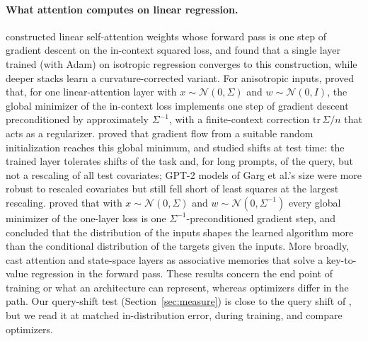 \paragraph{What attention computes on linear regression.} \citet{vonoswald2023} constructed linear self-attention weights whose forward pass is one step of gradient descent on the in-context squared loss, and found that a single layer trained (with Adam) on isotropic regression converges to this construction, while deeper stacks learn a curvature-corrected variant. For anisotropic inputs, \citet{ahn2023} proved that, for one linear-attention layer with $x \sim \mathcal N(0, \Sigma)$ and $w \sim \mathcal N(0, I)$, the global minimizer of the in-context loss implements one step of gradient descent preconditioned by approximately $\Sigma^{-1}$, with a finite-context correction $\mathrm{tr}\,\Sigma/n$ that acts as a regularizer. \citet{zhang2023trained} proved that gradient flow from a suitable random initialization reaches this global minimum, and studied shifts at test time: the trained layer tolerates shifts of the task and, for long prompts, of the query, but not a rescaling of all test covariates; GPT-2 models of Garg et al.'s size were more robust to rescaled covariates but still fell short of least squares at the largest rescaling. \citet{mahankali2023} proved that with $x \sim \mathcal N(0,\Sigma)$ and $w \sim \mathcal N(0, \Sigma^{-1})$ every global minimizer of the one-layer loss is one $\Sigma^{-1}$-preconditioned gradient step, and concluded that the distribution of the inputs shapes the learned algorithm more than the conditional distribution of the targets given the inputs. More broadly, \citet{wang2025testtime} cast attention and state-space layers as associative memories that solve a key-to-value regression in the forward pass. These results concern the end point of training or what an architecture can represent, whereas optimizers differ in the path. Our query-shift test (Section~\ref{sec:measure}) is close to the query shift of \citet{zhang2023trained}, but we read it at matched in-distribution error, during training, and compare optimizers.

